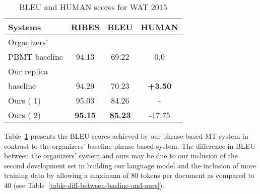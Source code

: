 \begin{table}[!ht]
\center
    \begin{tabular}{lccc}
    \textbf{Systems}           & \textbf{RIBES} & \textbf{BLEU}  & \textbf{HUMAN}  \\ \hline
    Organizers'            	   &  				&   \\
    PBMT baseline         	   & 94.13				& 69.22 	& 0.0      \\ \hline
    Our  replica     		   &				& 				& \    \\
    baseline    			   & 94.29				& 70.23   & \textbf{+3.50}    \\
	Ours (\mert{} 1)              & 95.03				& 84.26 			& -      \\
	Ours (\mert{} 2)              & \textbf{95.15}				& \textbf{85.23} & -17.75 \\

    \end{tabular}
\caption{BLEU and HUMAN scores for WAT 2015}
\label{table-bleu-and-human-scores}
\end{table}

Table~\ref{table-bleu-and-human-scores} presents the BLEU scores achieved by our phrase-based MT system in contrast to the organizers' baseline phrase-based system. The difference in BLEU between the organizers' system and ours may be due to our inclusion of the second development set in building our language model and the inclusion of more training data by allowing a maximum of 80 tokens per document as compared to 40 (see Table~\ref{table-diff-between-basline-and-ours}). 


